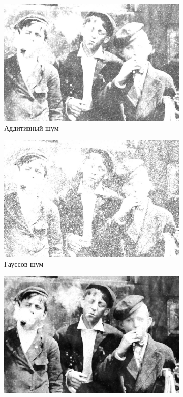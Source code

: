 \begin{figure}[ht]
\begin{subfigure}[b]{0.5\linewidth}
      \includegraphics[width=0.95\linewidth]{../Rang_Filter/Rang_Additive_noise_(k=5,r=25).jpg} 
      \caption{Аддитивный шум} 
      \label{rang_5_25:c} 
      \vspace{4ex}
    \end{subfigure}%
    \begin{subfigure}[b]{0.5\linewidth}
      \centering
      \includegraphics[width=0.95\linewidth]{../Rang_Filter/Rang_Gaussian_noise_(k=5,r=25).jpg} 
      \caption{Гауссов шум} 
      \label{rang_5_25:d} 
      \vspace{4ex}
    \end{subfigure}
    \begin{subfigure}[b]{0.5\linewidth}
      \centering
      \includegraphics[width=0.95\linewidth]{../Rang_Filter/Rang_Poisson_noise_(k=5,r=25).jpg} 

\end{subfigure}
\end{figure}
